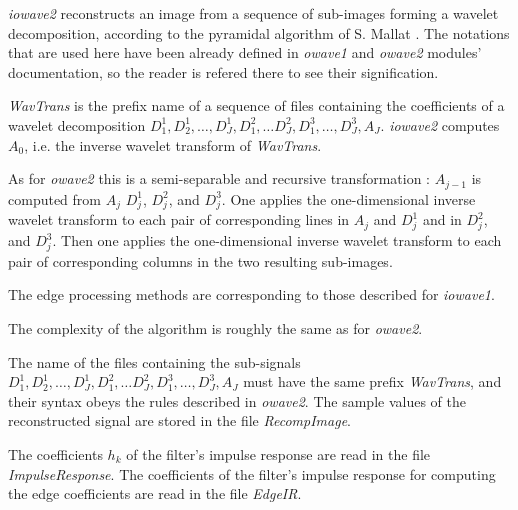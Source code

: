 \def\real{I\!\!R}


{\em iowave2} reconstructs an image from a sequence of sub-images forming 
a wavelet decomposition, according to the pyramidal algorithm of S. Mallat 
\cite{kn:ma1}. 
The notations that are used here have been already defined in {\em owave1} 
and {\em owave2} modules' documentation, so the reader is refered 
there to see their signification. 

{\em WavTrans} is the prefix name of a sequence of files containing 
the coefficients of a wavelet decomposition  $D^{1}_{1}, D^{1}_{2}, \ldots, 
D^{1}_{J}, D^{2}_{1}, \ldots D^{2}_{J}, D^{3}_{1}, \ldots, D^{3}_{J}, A_{J}$. 
{\em iowave2} computes \( A_{0} \), i.e. the inverse wavelet transform 
of {\em WavTrans}. 

As for {\em owave2} this is a semi-separable and recursive transformation : 
\( A_{j-1} \) is computed from \( A_{j} \) \( D^{1}_{j} \), \( D^{2}_{j} \), 
and \( D^{3}_{j} \). One applies the one-dimensional inverse wavelet transform 
to each pair of corresponding lines in \( A_{j} \) and \( D^{1}_{j} \) and in 
$D^{2}_{j}$, and $D^{3}_{j}$. Then one applies the one-dimensional inverse 
wavelet transform to each pair of corresponding columns in the two resulting 
sub-images. 

The edge processing methods are corresponding to those described for 
{\em iowave1}.

The complexity of the algorithm is roughly the same as for {\em owave2}.

The name of the files containing the sub-signals 
$D^{1}_{1}, D^{1}_{2}, \ldots, D^{1}_{J}, D^{2}_{1}, \ldots D^{2}_{J}, 
D^{3}_{1}, \ldots, D^{3}_{J}, A_{J}$ must have the same prefix {\em WavTrans}, 
and their syntax obeys the rules described in {\em owave2}. 
The sample values of the reconstructed signal are stored in the file 
{\em RecompImage}. 

The coefficients \( h_{k} \) of the filter's impulse response are read 
in the file {\em ImpulseResponse}. The coefficients of the filter's 
impulse response for computing the edge coefficients are read in the file 
{\em EdgeIR}. 


